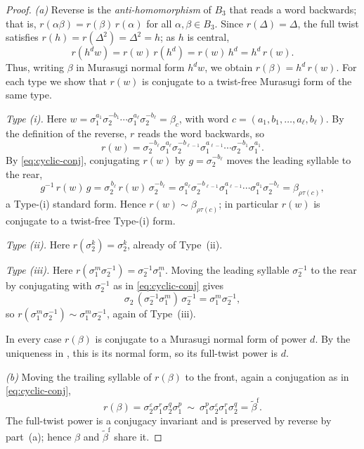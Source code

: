 \documentclass[11pt]{article}
\theoremstyle{definition}
\begin{document}
\begin{proof}
\noindent\emph{\textup{(a)}} Reverse is the \emph{anti-homomorphism} of $B_3$ that reads a
word backwards; that is, $r(\alpha\beta)=r(\beta)\,r(\alpha)$ for all
$\alpha,\beta\in B_3$. Since $r(\Delta)=\Delta$, the full twist satisfies
$r(h)=r(\Delta^{2})=\Delta^{2}=h$; as $h$ is central,
\[
r(h^{d}w)=r(w)\,r(h^{d})=r(w)\,h^{d}=h^{d}\,r(w).
\]
Thus, writing $\beta$ in Murasugi normal form $h^{d}w$, we obtain
$r(\beta)=h^{d}\,r(w)$. For each type we show that $r(w)$ is conjugate to a twist-free Murasugi form
of the same type.

\smallskip
\noindent\emph{Type \textup{(i)}.} Here $w=\sigma_1^{a_1}\sigma_2^{-b_1}\cdots
\sigma_1^{a_\ell}\sigma_2^{-b_\ell}=\beta_c$, with word
$c=(a_1,b_1,\dots,a_\ell,b_\ell)$. By the definition of the reverse, $r$ reads the
word backwards, so
\[
r(w)=\sigma_2^{-b_\ell}\sigma_1^{a_\ell}\sigma_2^{-b_{\ell-1}}\sigma_1^{a_{\ell-1}}
\cdots\sigma_2^{-b_1}\sigma_1^{a_1}.
\]
By \eqref{eq:cyclic-conj}, conjugating $r(w)$ by $g=\sigma_2^{-b_\ell}$ moves the leading
syllable to the rear,
\[
g^{-1}\,r(w)\,g
=\sigma_2^{\,b_\ell}\,r(w)\,\sigma_2^{-b_\ell}
=\sigma_1^{a_\ell}\sigma_2^{-b_{\ell-1}}\sigma_1^{a_{\ell-1}}\cdots
\sigma_1^{a_1}\sigma_2^{-b_\ell}
=\beta_{\rho\tau(c)},
\]
a Type-(i) standard form. Hence $r(w)\sim\beta_{\rho\tau(c)}$; in particular $r(w)$
is conjugate to a twist-free Type-(i) form.

\smallskip
\noindent\emph{Type \textup{(ii)}.} Here $r(\sigma_2^{k})=\sigma_2^{k}$, already of
Type~(ii).

\smallskip
\noindent\emph{Type \textup{(iii)}.} Here $r(\sigma_1^{m}\sigma_2^{-1})
=\sigma_2^{-1}\sigma_1^{m}$. Moving the leading syllable $\sigma_2^{-1}$ to the rear by
conjugating with $\sigma_2^{-1}$ as in \eqref{eq:cyclic-conj} gives
\[
\sigma_2\,(\sigma_2^{-1}\sigma_1^{m})\,\sigma_2^{-1}=\sigma_1^{m}\sigma_2^{-1},
\]
so $r(\sigma_1^{m}\sigma_2^{-1})\sim\sigma_1^{m}\sigma_2^{-1}$, again of Type~(iii).

\smallskip
\noindent In every case $r(\beta)$ is conjugate to a Murasugi normal form of power $d$. By
the uniqueness in , this is its normal form, so its full-twist power
is $d$.

\smallskip
\noindent\emph{\textup{(b)}} Moving the trailing syllable of $r(\beta)$ to the front,
again a conjugation as in \eqref{eq:cyclic-conj},
\[
r(\beta)=\sigma_2^{\varepsilon}\sigma_1^{r}\sigma_2^{q}\sigma_1^{p}
\ \sim\ \sigma_1^{p}\sigma_2^{\varepsilon}\sigma_1^{r}\sigma_2^{q}
=\widetilde\beta^{\mathrm f}.
\]
The full-twist power is a conjugacy invariant and is preserved by reverse by part~(a);
hence $\beta$ and $\widetilde\beta^{\mathrm f}$ share it.
\end{proof}
\end{document}
